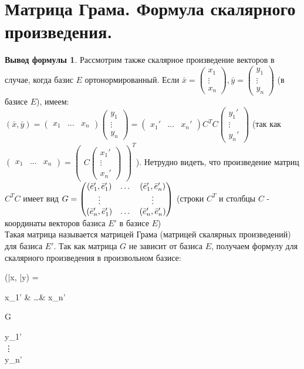 \documentclass[a4paper, 12pt]{article}
\theoremstyle{definition}
\newtheorem*{formula}{Вывод формулы}
\newenvironment{boxedalign*}
  {\begin{equation*}\begin{lrbox}{\boxedalignbox}$\begin{aligned}}
  {\end{aligned}$\end{lrbox}\fbox{\usebox{\boxedalignbox}}\end{equation*}}
\begin{document}
	\section{Матрица Грама. Формула скалярного произведения.}
	\begin{formula}
		Рассмотрим также скалярное произведение векторов в случае, когда базис $E$ ортонормированный. Если $\bar{x} = \begin{pmatrix} x_{1} \\ \vdots \\ x_{n}  \end{pmatrix}, \bar{y} = \begin{pmatrix} y_{1} \\ \vdots \\ y_{n}  \end{pmatrix}$ (в базисе $E$), имеем: $(\bar{x}, \bar{y}) = \begin{pmatrix} x_{1}&\dots&x_{n} \end{pmatrix} \begin{pmatrix} y_{1} \\ \vdots \\ y_{n} \end{pmatrix} = \begin{pmatrix} x_{1}'&\dots&x_{n}' \end{pmatrix}C^{T}C\begin{pmatrix} y_{1}' \\ \vdots \\ y_{n}' \end{pmatrix}$ (так как $\begin{pmatrix} x_{1}&\dots&x_{n}\end{pmatrix} = \begin{pmatrix} C \begin{pmatrix} x_{1}' \\ \vdots \\x_{n}' \end{pmatrix}\end{pmatrix}^{T}$). Нетрудно видеть, что произведение матриц $C^{T}C$ имеет вид $G = \begin{pmatrix} (\bar{e}_{1}', \bar{e}_{1}')&\dots&(\bar{e}_{1}', \bar{e}_{n}') \\ \vdots&\null&\vdots \\ (\bar{e}_{n}', \bar{e}_{1}') & \dots & (\bar{e}_{n}', \bar{e}_{n}') \end{pmatrix}$ (строки $C^{T}$ и столбцы $C$ - координаты векторов базиса $E'$ в базисе $E$) \\
		Такая матрица называется матрицей Грама (матрицей скалярных произведений) для базиса $E'$. Так как матрица $G$ не зависит от базиса $E$, получаем формулу для скалярного произведения в произвольном базисе: \begin{boxedalign*}(\bar{x}, \bar{y}) = \begin{pmatrix} x_{1}' & \dots & x_{n}' \end{pmatrix}G\begin{pmatrix} y_{1}' \\ \vdots \\ y_{n}' \end{pmatrix} \end{boxedalign*}
	\end{formula}
\end{document}
